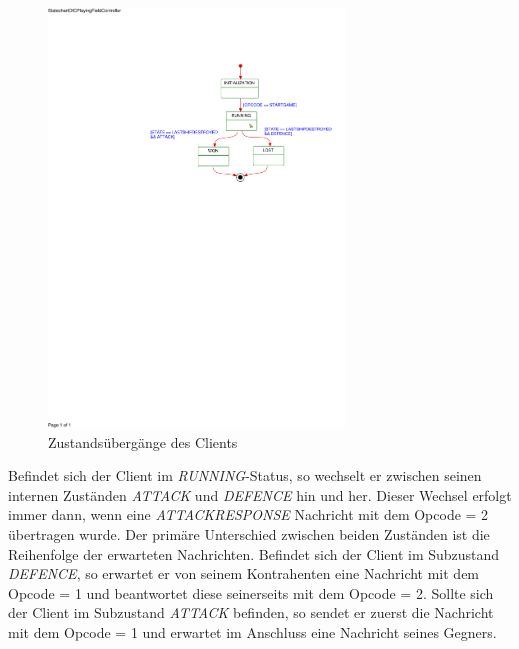 \begin{figure}[H]
  \centering
  \includegraphics[trim=70mm 170mm 5mm 39mm,clip,width=0.7\textwidth]{images/SMController.pdf}
  \caption{Zustandsübergänge des Clients}
  \label{fig:Clientstates}
\end{figure}


Befindet sich der Client im \emph{RUNNING}-Status, so wechselt er zwischen seinen internen Zuständen \emph{ATTACK} und \emph{DEFENCE} hin und her.
Dieser Wechsel erfolgt immer dann, wenn eine \emph{ATTACKRESPONSE} Nachricht mit dem Opcode = 2 übertragen wurde.
Der primäre Unterschied zwischen beiden Zuständen ist die Reihenfolge der erwarteten Nachrichten.
Befindet sich der Client im Subzustand \emph{DEFENCE}, so erwartet er von seinem Kontrahenten eine Nachricht mit dem Opcode = 1 und beantwortet diese seinerseits mit dem Opcode = 2.
Sollte sich der Client im Subzustand \emph{ATTACK} befinden, so sendet er zuerst die Nachricht mit dem Opcode = 1 und erwartet im Anschluss eine Nachricht seines Gegners.

